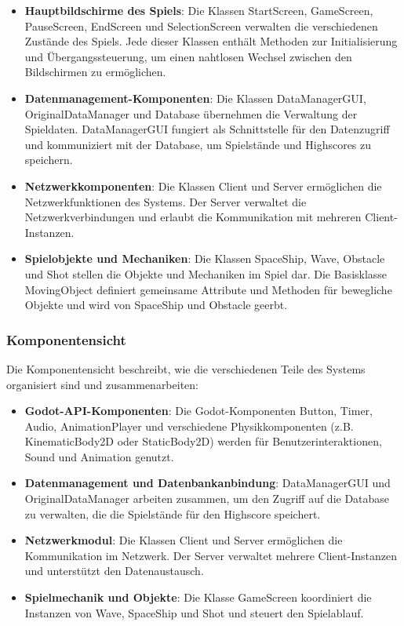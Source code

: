 \documentclass[10pt]{article}
\begin{document}
\begin{itemize}
    \item \textbf{Hauptbildschirme des Spiels}: Die Klassen StartScreen, GameScreen, PauseScreen, EndScreen und SelectionScreen verwalten die verschiedenen Zustände des Spiels. Jede dieser Klassen enthält Methoden zur Initialisierung und Übergangssteuerung, um einen nahtlosen Wechsel zwischen den Bildschirmen zu ermöglichen.

    \item \textbf{Datenmanagement-Komponenten}: Die Klassen DataManagerGUI, OriginalDataManager und Database übernehmen die Verwaltung der Spieldaten. DataManagerGUI fungiert als Schnittstelle für den Datenzugriff und kommuniziert mit der Database, um Spielstände und Highscores zu speichern.

    \item \textbf{Netzwerkkomponenten}: Die Klassen Client und Server ermöglichen die Netzwerkfunktionen des Systems. Der Server verwaltet die Netzwerkverbindungen und erlaubt die Kommunikation mit mehreren Client-Instanzen.

    \item \textbf{Spielobjekte und Mechaniken}: Die Klassen SpaceShip, Wave, Obstacle und Shot stellen die Objekte und Mechaniken im Spiel dar. Die Basisklasse MovingObject definiert gemeinsame Attribute und Methoden für bewegliche Objekte und wird von SpaceShip und Obstacle geerbt.
\end{itemize}

\subsubsection{Komponentensicht}

Die Komponentensicht beschreibt, wie die verschiedenen Teile des Systems organisiert sind und zusammenarbeiten:

\begin{itemize}
    \item \textbf{Godot-API-Komponenten\footnotemark[5]}: Die Godot-Komponenten Button, Timer, Audio, AnimationPlayer und verschiedene Physikkomponenten (z.B. KinematicBody2D oder StaticBody2D) werden für Benutzerinteraktionen, Sound und Animation genutzt.

    \item \textbf{Datenmanagement und Datenbankanbindung\footnotemark[6]}: DataManagerGUI und OriginalDataManager arbeiten zusammen, um den Zugriff auf die Database zu verwalten, die die Spielstände für den Highscore speichert.

    \item \textbf{Netzwerkmodul}: Die Klassen Client und Server ermöglichen die Kommunikation im Netzwerk. Der Server verwaltet mehrere Client-Instanzen und unterstützt den Datenaustausch.

    \item \textbf{Spielmechanik und Objekte}: Die Klasse GameScreen koordiniert die Instanzen von Wave, SpaceShip und Shot und steuert den Spielablauf.
\end{itemize}
\end{document}

